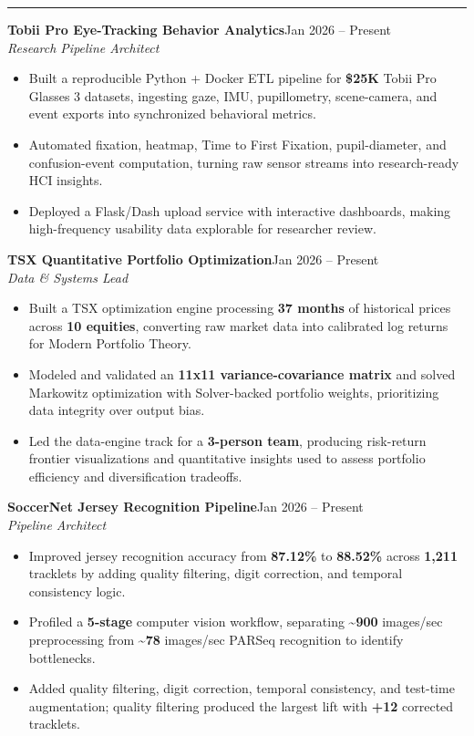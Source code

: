 \documentclass[10pt,letterpaper]{article}
\newenvironment{resumeItems}{
  \begin{itemize}
    \raggedright
    \setlength{\leftmargin}{1.15em}
    \setlength{\topsep}{0pt}
    \setlength{\itemsep}{0pt}
    \setlength{\parsep}{0pt}
    \setlength{\partopsep}{0pt}
}{
  \end{itemize}
  \vspace{-5pt}
}
\newcommand{\sectionTitle}[1]{
  \vspace{3pt}
  \noindent{\normalsize\bfseries #1}\par
  \vspace{2pt}
  \hrule
  \vspace{3pt}
}
\newcommand{\project}[3]{
  \textbf{#1}\hfill #3\\[0pt]
  \textit{#2}
}
\begin{document}
\sectionTitle{Projects}
\project{Tobii Pro Eye-Tracking Behavior Analytics}{Research Pipeline Architect}{Jan 2026 -- Present}
\begin{resumeItems}
  \item Built a reproducible Python + Docker ETL pipeline for \textbf{\$25K} Tobii Pro Glasses 3 datasets, ingesting gaze, IMU, pupillometry, scene-camera, and event exports into synchronized behavioral metrics.
  \item Automated fixation, heatmap, Time to First Fixation, pupil-diameter, and confusion-event computation, turning raw sensor streams into research-ready HCI insights.
  \item Deployed a Flask/Dash upload service with interactive dashboards, making high-frequency usability data explorable for researcher review.
\end{resumeItems}

\project{TSX Quantitative Portfolio Optimization}{Data \& Systems Lead}{Jan 2026 -- Present}
\begin{resumeItems}
  \item Built a TSX optimization engine processing \textbf{37 months} of historical prices across \textbf{10 equities}, converting raw market data into calibrated log returns for Modern Portfolio Theory.
  \item Modeled and validated an \textbf{11x11 variance-covariance matrix} and solved Markowitz optimization with Solver-backed portfolio weights, prioritizing data integrity over output bias.
  \item Led the data-engine track for a \textbf{3-person team}, producing risk-return frontier visualizations and quantitative insights used to assess portfolio efficiency and diversification tradeoffs.
\end{resumeItems}

\project{SoccerNet Jersey Recognition Pipeline}{Pipeline Architect}{Jan 2026 -- Present}
\begin{resumeItems}
  \item Improved jersey recognition accuracy from \textbf{87.12\%} to \textbf{88.52\%} across \textbf{1,211} tracklets by adding quality filtering, digit correction, and temporal consistency logic.
  \item Profiled a \textbf{5-stage} computer vision workflow, separating \textbf{\textasciitilde{}900} images/sec preprocessing from \textbf{\textasciitilde{}78} images/sec PARSeq recognition to identify bottlenecks.
  \item Added quality filtering, digit correction, temporal consistency, and test-time augmentation; quality filtering produced the largest lift with \textbf{+12} corrected tracklets.
\end{resumeItems}
\end{document}
